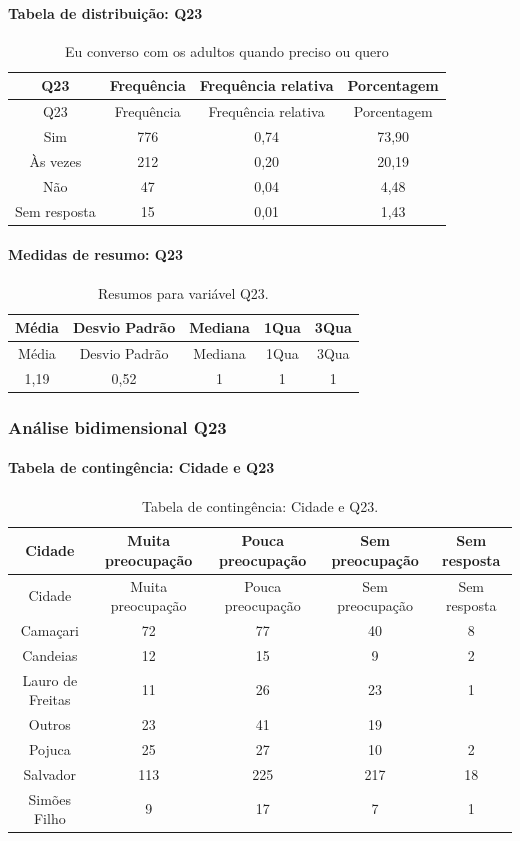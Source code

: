 \documentclass[]{article}
\let\oldparagraph\paragraph
\renewcommand{\paragraph}[1]{\oldparagraph{#1}\mbox{}}
\begin{document}
\hypertarget{tabela-de-distribuiuxe7uxe3o-q23}{%
\paragraph{Tabela de distribuição: Q23}\label{tabela-de-distribuiuxe7uxe3o-q23}}

\begin{longtable}[]{@{}cccc@{}}
\caption{\label{tab:unnamed-chunk-541}Eu converso com os adultos quando preciso ou quero}\tabularnewline
\toprule
Q23 & Frequência & Frequência relativa & Porcentagem\tabularnewline
\midrule
\endfirsthead
\toprule
Q23 & Frequência & Frequência relativa & Porcentagem\tabularnewline
\midrule
\endhead
Sim & 776 & 0,74 & 73,90\tabularnewline
Às vezes & 212 & 0,20 & 20,19\tabularnewline
Não & 47 & 0,04 & 4,48\tabularnewline
Sem resposta & 15 & 0,01 & 1,43\tabularnewline
\bottomrule
\end{longtable}

\hypertarget{medidas-de-resumo-q23}{%
\paragraph{Medidas de resumo: Q23}\label{medidas-de-resumo-q23}}

\begin{longtable}[]{@{}ccccc@{}}
\caption{\label{tab:unnamed-chunk-542}Resumos para variável Q23.}\tabularnewline
\toprule
Média & Desvio Padrão & Mediana & 1Qua & 3Qua\tabularnewline
\midrule
\endfirsthead
\toprule
Média & Desvio Padrão & Mediana & 1Qua & 3Qua\tabularnewline
\midrule
\endhead
1,19 & 0,52 & 1 & 1 & 1\tabularnewline
\bottomrule
\end{longtable}

\cleardoublepage

\hypertarget{anuxe1lise-bidimensional-q23}{%
\subsubsection{Análise bidimensional Q23}\label{anuxe1lise-bidimensional-q23}}

\hypertarget{tabela-de-continguxeancia-cidade-e-q23}{%
\paragraph{Tabela de contingência: Cidade e Q23}\label{tabela-de-continguxeancia-cidade-e-q23}}

\begin{longtable}[]{@{}ccccc@{}}
\caption{\label{tab:unnamed-chunk-543}Tabela de contingência: Cidade e Q23.}\tabularnewline
\toprule
Cidade & Muita preocupação & Pouca preocupação & Sem preocupação & Sem resposta\tabularnewline
\midrule
\endfirsthead
\toprule
Cidade & Muita preocupação & Pouca preocupação & Sem preocupação & Sem resposta\tabularnewline
\midrule
\endhead
Camaçari & 72 & 77 & 40 & 8\tabularnewline
Candeias & 12 & 15 & 9 & 2\tabularnewline
Lauro de Freitas & 11 & 26 & 23 & 1\tabularnewline
Outros & 23 & 41 & 19 &\tabularnewline
Pojuca & 25 & 27 & 10 & 2\tabularnewline
Salvador & 113 & 225 & 217 & 18\tabularnewline
Simões Filho & 9 & 17 & 7 & 1\tabularnewline
\bottomrule
\end{longtable}
\end{document}
